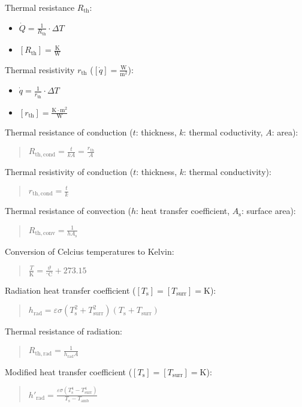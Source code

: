 \documentclass[fontsize=9pt,a4paper,twocolumn]{scrartcl}
\begin{document}
Thermal resistance $R_\mathrm{th}$:
\begin{itemize}
	\item $\dot Q = \frac{1}{R_\mathrm{th}}\cdot\Delta T$
	\item $[R_\mathrm{th}]=\frac{\mathrm{K}}{\mathrm{W}}$
\end{itemize}
\newpage
Thermal resistivity $r_\mathrm{th}$ ($[\dot q]=\frac{\mathrm{W}}{\mathrm{m}^2}$):
\begin{itemize}
	\item $\dot q = \frac{1}{r_\mathrm{th}}\cdot\Delta T$
	\item $[r_\mathrm{th}]=\frac{\mathrm{K}\cdot\mathrm{m}^2}{\mathrm{W}}$
\end{itemize}

Thermal resistance of conduction ($t$: thickness, $k$: thermal coductivity, $A$: area):
\begin{quote}
	$R_{\mathrm{th},\mathrm{cond}} = \frac{t}{kA} = \frac{r_\mathrm{th}}{A}$
\end{quote}

Thermal resistivity of conduction ($t$: thickness, $k$: thermal conductivity):
\begin{quote}
	$r_{\mathrm{th},\mathrm{cond}} = \frac{t}{k}$
\end{quote}

Thermal resistance of convection ($h$: heat transfer coefficient, $A_\mathrm{s}$: surface area):
\begin{quote}
	$R_{\mathrm{th},\mathrm{conv}} = \frac{1}{h A_\mathrm{s}}$
\end{quote}

Conversion of Celcius temperatures to Kelvin:
\begin{quote}
    $\frac{T}{\mathrm{K}} = \frac{\vartheta}{^\circ\mathrm{C}} + 273.15$
\end{quote}

Radiation heat transfer coefficient ($[T_\mathrm{s}]=[T_\mathrm{surr}]=\mathrm{K}$):
\begin{quote}
	$h_\mathrm{rad}=\varepsilon\sigma (T_\mathrm{s}^2+T_\mathrm{surr}^2) (T_\mathrm{s}+T_\mathrm{surr})$
\end{quote}

Thermal resistance of radiation:
\begin{quote}
	$R_{\mathrm{th},\mathrm{rad}} = \frac{1}{h_\mathrm{rad} A}$
\end{quote}

Modified heat transfer coefficient ($[T_\mathrm{s}]=[T_\mathrm{surr}]=\mathrm{K}$):
\begin{quote}
	$h'_\mathrm{rad} = \frac{\varepsilon\sigma(T_\mathrm{s}^4-T_\mathrm{surr}^4)}{T_\mathrm{s}-T_\mathrm{amb}}$
\end{quote}
\end{document}
